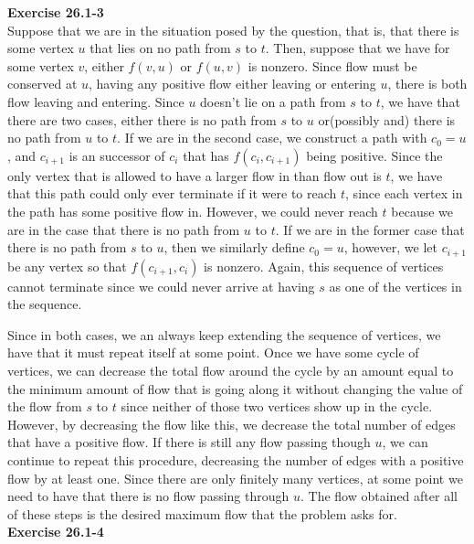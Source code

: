 \documentclass{article}
\begin{document}
\noindent\textbf{Exercise 26.1-3}\\

Suppose that we are in the situation posed by the question, that is, that there is some vertex $u$ that lies on no path from $s$ to $t$. Then, suppose that we have for some vertex $v$, either $f(v,u)$ or $f(u,v)$ is nonzero. Since flow must be conserved at $u$, having any positive flow either leaving or entering $u$, there is both flow leaving and entering. Since $u$ doesn't lie on a path from $s$ to $t$, we have that there are two cases, either there is no path from $s$ to $u$ or(possibly and) there is no path from $u$ to $t$. If we are in the second case, we construct a path with $c_0 = u$, and $c_{i+1}$ is an successor of $c_i$ that has $f(c_i,c_{i+1})$ being positive. Since the only vertex that is allowed to have a larger flow in than flow out is $t$, we have that this path could only ever terminate if it were to reach $t$, since each vertex in the path has some positive flow in. However, we could never reach $t$ because we are in the case that there is no path from $u$ to $t$. If we are in the former case that there is no path from $s$ to $u$, then we similarly define $c_0 = u$, however, we let $c_{i+1}$ be any vertex so that $f(c_{i+1},c_i)$ is nonzero. Again, this sequence of vertices cannot terminate since we could never arrive at having $s$ as one of the vertices in the sequence.

Since in both cases, we an always keep extending the sequence of vertices, we have that it must repeat itself at some point. Once we have some cycle of vertices, we can decrease the total flow around the cycle by an amount equal to the minimum amount of flow that is going along it without changing the value of the flow from $s$ to $t$ since neither of those two vertices show up in the cycle. However, by decreasing the flow like this, we decrease the total number of edges that have a positive flow. If there is still any flow passing though $u$, we can continue to repeat this procedure, decreasing the number of edges with a positive flow by at least one. Since there are only finitely many vertices, at some point we need to have that there is no flow passing through $u$. The flow obtained after all of these steps is the desired maximum flow that the problem asks for.\\

\noindent\textbf{Exercise 26.1-4}\\
\end{document}
